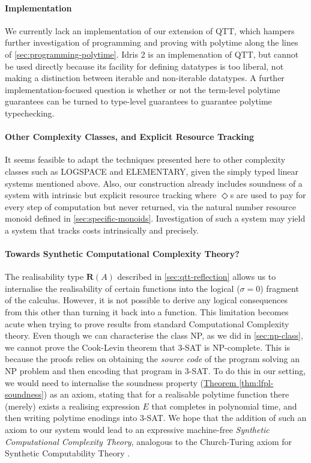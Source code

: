 \documentclass[acmsmall,screen]{acmart}
\newcommand{\thmref}[1]{\hyperref[#1]{Theorem \ref*{#1}}}
\begin{document}
\paragraph{Implementation} We currently lack an implementation of our
extension of QTT, which hampers further investigation of programming
and proving with polytime along the lines of
\autoref{sec:programming-polytime}. Idris 2 \cite{Brady21} is an
implemenation of QTT, but cannot be used directly because its facility
for defining datatypes is too liberal, not making a distinction
between iterable and non-iterable datatypes. A further
implementation-focused question is whether or not the term-level
polytime guarantees can be turned to type-level guarantees to
guarantee polytime typechecking.

\paragraph{Other Complexity Classes, and Explicit Resource Tracking}
It seems feasible to adapt the techniques presented here to other
complexity classes such as LOGSPACE and ELEMENTARY, given the simply
typed linear systems mentioned above. Also, our construction already
includes soundness of a system with intrinsic but explicit resource
tracking where $\Diamond$s are used to pay for every step of
computation but never returned, via the natural number resource monoid
defined in \autoref{sec:specific-monoids}. Investigation of such a
system may yield a system that tracks costs intrinsically and
precisely.

\paragraph{Towards Synthetic Computational Complexity Theory?}

The realisability type $\mathbf{R}(A)$ described in
\autoref{sec:qtt-reflection} allows us to internalise the
realisability of certain functions into the logical ($\sigma = 0$)
fragment of the calculus. However, it is not possible to derive any
logical consequences from this other than turning it back into a
function. This limitation becomes acute when trying to prove results
from standard Computational Complexity theory. Even though we can
characterise the class NP, as we did in \autoref{sec:np-class}, we
cannot prove the Cook-Levin theorem that 3-SAT is NP-complete. This is
because the proofs relies on obtaining the \emph{source code} of the
program solving an NP problem and then encoding that program in
3-SAT. To do this in our setting, we would need to internalise the
soundness property (\thmref{thm:lfpl-soundness}) as an axiom, stating
that for a realisable polytime function there (merely) exists a
realising expression $E$ that completes in polynomial time, and then
writing polytime enodings into 3-SAT. We hope that the addition of
such an axiom to our system would lead to an expressive machine-free
\emph{Synthetic Computational Complexity Theory}, analogous to the
Church-Turing axiom for Synthetic Computability Theory \cite{Bauer06}.
\end{document}
